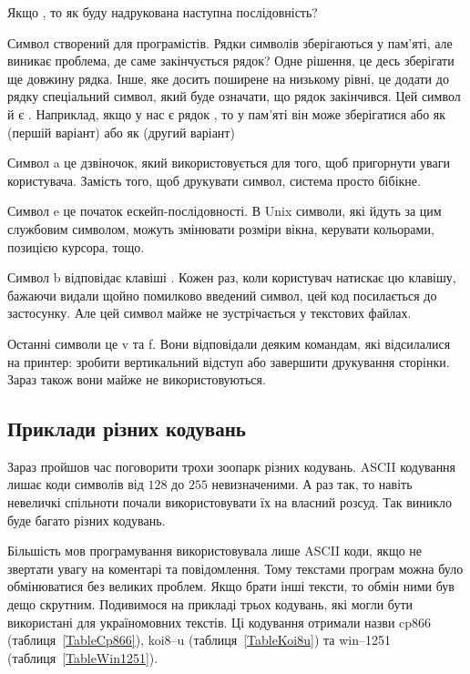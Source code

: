 \goodbreak
\begin{exercise}
Якщо , то як буду надрукована наступна послідовність?
\end{exercise}

Символ  створений для програмістів.
Рядки символів зберігаються у пам'яті, але виникає проблема, де саме закінчується рядок?
Одне рішення, це десь зберігати ще довжину рядка.
Інше, яке досить поширене на низькому рівні, це додати до рядку спеціальний символ, який буде означати, що рядок закінчився.
Цей символ й є .
Наприклад, якщо у нас є рядок , то у пам'яті він може зберігатися або як (першій варіант)
\noindent або як (другий варіант)

Символ \chesc a це дзвіночок, який використовується для того, щоб пригорнути уваги користувача.
Замість того, щоб друкувати символ, система просто бібікне.

Символ \chesc e це початок ескейп-послідовності.
В Unix символи, які йдуть за цим службовим символом, можуть змінювати розміри вікна, керувати кольорами, позицією курсора, тощо.

Символ \chesc b відповідає клавіші \keys{\backspace}.
Кожен раз, коли користувач натискає цю клавішу, бажаючи видали щойно помилково введений символ, цей код посилається до застосунку.
Але цей символ майже не зустрічається у текстових файлах.

Останні символи це \chesc v та \chesc f.
Вони відповідали деяким командам, які відсилалися на принтер: зробити вертикальний відступ або завершити друкування сторінки.
Зараз також вони майже не використовуються.

\subsection{Приклади різних кодувань}

Зараз пройшов час поговорити трохи зоопарк різних кодувань.
ASCII кодування лишає коди символів від $128$ до $255$ невизначеними.
А раз так, то навіть невеличкі спільноти почали використовувати їх на власний розсуд.
Так виникло буде багато різних кодувань.

Більшість мов програмування використовувала лише ASCII коди, якщо не звертати увагу на коментарі та повідомлення.
Тому текстами програм можна було обмінюватися без великих проблем.
Якщо брати інші тексти, то обмін ними був дещо скрутним.
Подивимося на прикладі трьох кодувань,  які могли бути використані для україномовних текстів.
Ці кодування отримали назви cp866 (таблиця~\ref{TableCp866}), koi8--u (таблиця~\ref{TableKoi8u}) та win--1251 (таблиця~\ref{TableWin1251}).

